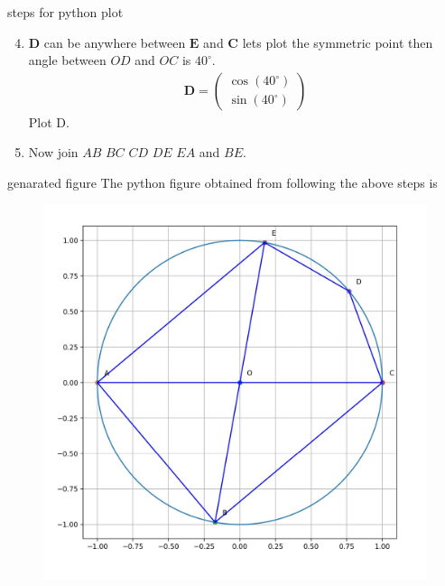 \documentclass{beamer}
\let\vec\mathbf
\newcommand{\myvec}[1]{\ensuremath{\begin{pmatrix}#1\end{pmatrix}}}
\begin{document}
        \begin{frame}{steps for python plot}
        \begin{enumerate}
            \setcounter{enumi}{3}
               \item $\vec{D}$ can be anywhere between $\vec{E}$ and $\vec{C}$
   lets plot the symmetric point then angle between $OD$ and $OC$ is $40^{\circ}$.
   \begin{align}
       \vec{D}=\myvec{\cos(40^{\circ})\\\sin(40^{\circ})}
   \end{align}
   Plot D.\\
   \item Now join $AB$ $BC$ $CD$ $DE$ $EA$ and $BE$.
        \end{enumerate}
        \end{frame}
        
        \begin{frame}{genarated figure}
         The python figure obtained from following the above steps is
  \begin{figure}[h!]  
            \includegraphics[scale=0.25]{pythonfig.jpg}
            \label{Fig2} 
             \caption{}
      \end{figure}
        
        \end{frame}
\end{document}
